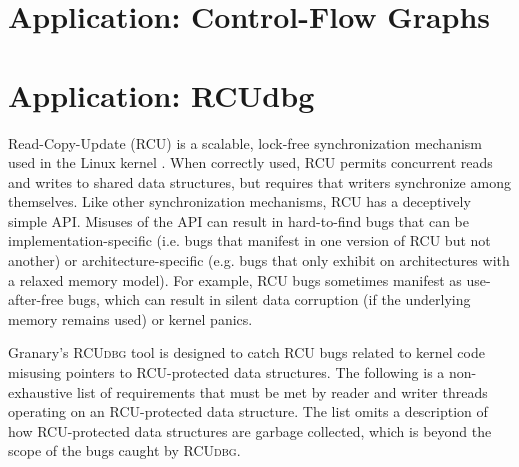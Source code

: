 \documentclass[preprint]{sigplanconf}
\newcommand{\toolname}[1]{{\scshape #1}}
\begin{document}



\section{Application: Control-Flow Graphs}\label{sec:cfg}

\section{Application: RCUdbg}\label{sec:rcudbg}

Read-Copy-Update (RCU) is a scalable, lock-free synchronization mechanism used in the Linux kernel \cite{RCU,RCUInLinux}. When correctly used, RCU permits concurrent reads and writes to shared data structures, but requires that writers synchronize among themselves. Like other synchronization mechanisms, RCU has a deceptively simple API. Misuses of the API can result in hard-to-find bugs that can be implementation-specific (i.e. bugs that manifest in one version of RCU but not another) or architecture-specific (e.g. bugs that only exhibit on architectures with a relaxed memory model). For example, RCU bugs sometimes manifest as use-after-free bugs, which can result in silent data corruption (if the underlying memory remains used) or kernel panics. 


Granary's \toolname{RCUdbg} tool is designed to catch RCU bugs related to kernel code misusing pointers to RCU-protected data structures. The following is a non-exhaustive list of requirements that must be met by reader and writer threads operating on an RCU-protected data structure. The list omits a description of how RCU-protected data structures are garbage collected, which is beyond the scope of the bugs caught by \toolname{RCUdbg}.
\end{document}
